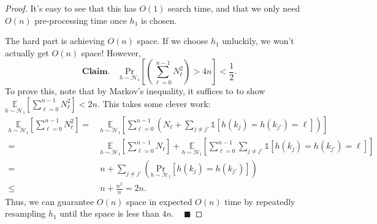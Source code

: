 \begin{proof}
    It's easy to see that this has $O(1)$ search time, and that we only need $O(n)$ pre-processing time once $h_1$ is chosen.

    The hard part is achieving $O(n)$ space.  If we choose $h_1$ unluckily, we won't actually get $O(n)$ space!  However,
    \[ \textbf{Claim.} ~~~~~ \underset{h \sim \mathcal{H}_1}{\mathrm{Pr}} \left [ \left(\sum_{\ell = 0}^{n - 1} N_{\ell}^2\right) > 4n \right ] < \dfrac{1}{2}. \]
    To prove this, note that by Markov's inequality, it suffices to to show $\underset{h \sim \mathcal{H}_1}{\mathbb{E}}\left [ \sum_{\ell = 0}^{n - 1} N_{\ell}^2 \right ] < 2n$.  This takes some clever work:
    \begin{align*}
        \underset{h \sim \mathcal{H}_1}{\mathbb{E}} \left [ \sum_{\ell = 0}^{n - 1} N_{\ell}^2 \right ] = \ & \underset{h \sim \mathcal{H}_1}{\mathbb{E}} \left [ \sum_{\ell = 0}^{n - 1} \left ( N_{\ell} + \sum_{j \neq j'} \mathds{1}\left [ h(k_j) = h(k_{j'}) = \ell \right ] \right ) \right ] \\
        = \ & \underset{h \sim \mathcal{H}_1}{\mathbb{E}}\left [ \sum_{\ell = 0}^{n - 1} N_{\ell} \right ] + \underset{h \sim \mathcal{H}_1}{\mathbb{E}} \left [  \sum_{\ell = 0}^{n - 1}  \sum_{j \neq j'} \mathds{1}\left [ h(k_j) = h(k_{j'}) = \ell \right ] \right ] \\
        = \ & n + \sum_{j \neq j'} \left(\underset{h \sim \mathcal{H}_1}{\mathrm{Pr}}[h(k_j) = h(k_{j'})] \right) \\
        \leq \ & n + \frac{n^2}{n} = 2n.
    \end{align*}
    Thus, we can guarantee $O(n)$ space in expected $O(n)$ time by repeatedly resampling $h_1$ until the space is less than $4n$. ~ $\blacksquare$
\end{proof}


